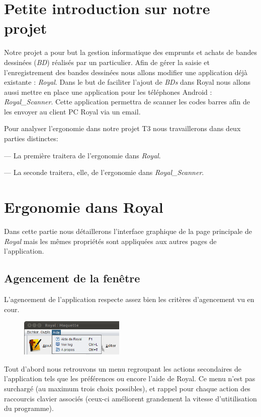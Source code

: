 \documentclass[etudiants]{support-iutrs}
\begin{document}
\header
\section{Petite introduction sur notre projet}

Notre projet a pour but la gestion informatique des emprunts et achats de bandes dessinées (\emph{BD}) réalisés par un particulier.
Afin de gérer la saisie et l’enregistrement des bandes dessinées nous allons modifier une application déjà existante : \emph{Royal}. 
Dans le but de faciliter l'ajout de \emph{BDs} dans Royal nous allons aussi mettre en place une application pour les téléphones Android : \emph{Royal\_Scanner}.
Cette application permettra de scanner les codes barres afin de les envoyer au client PC Royal via un email.

Pour analyser l'ergonomie dans notre projet T3 nous travaillerons dans deux parties distinctes: 

--- La première traitera de l'ergonomie dans \emph{Royal}.

--- La seconde traitera, elle, de l'ergonomie dans \emph{Royal\_Scanner}.

\section{Ergonomie dans Royal}
Dans cette partie nous détaillerons l'interface graphique de la page principale de \emph{Royal} mais les mêmes propriétés sont appliquées aux autres pages de l'application. 

\subsection{Agencement de la fenêtre}
L'agencement de l'application respecte assez bien les critères d'agencement vu en cour.

\begin{figure}
\includegraphics[width=5cm]{img/app_pc_maquette_menu.png}
\end{figure}

Tout d'abord nous retrouvons un menu regroupant les actions secondaires de l'application tels que les préférences ou encore l'aide de Royal. 
Ce menu n'est pas surchargé (au maximum trois choix possibles), et rappel pour chaque action des raccourcis clavier associés (ceux-ci améliorent grandement la vitesse d'utitilisation du programme).
\end{document}
